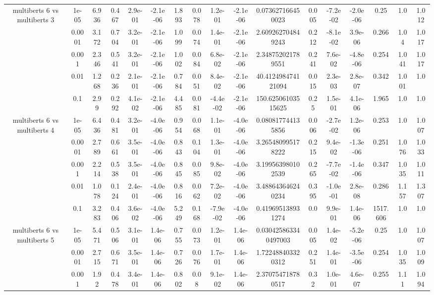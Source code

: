 \begin{tabular}{|c|c|c|c|c|c|c|c|c|c|c|c|c|c|c|c|c|}
\hline
\multirow{5}{*}{multiberts 6 vs multiberts 3} & 1e-05 & 6.936 & 0.467 & 2.9e-01 & -2.1e-06 & 1.893 & 0.078 & 1.2e-01 & -2.1e-06 & 0.073627166450023 & 0.005 & -7.2e-02 & -2.0e-06 & 0.25 & 1.0 & 1.012 \\
 & 0.0001 & 3.172 & 0.704 & 3.2e-01 & -2.1e-06 & 1.099 & 0.074 & 1.4e-01 & -2.1e-06 & 2.609262704849243 & 0.212 & -8.1e-02 & 3.9e-06 & 0.266 & 1.04 & 1.017 \\
 & 0.001 & 2.346 & 0.541 & 3.2e-01 & -2.1e-06 & 1.002 & 0.084 & 6.8e-02 & -2.1e-06 & 2.348752021789551 & 0.241 & 7.6e-02 & -4.8e-06 & 0.254 & 1.041 & 1.017 \\
 & 0.01 & 1.268 & 0.236 & 2.1e-01 & -2.1e-06 & 0.784 & 0.051 & 8.4e-02 & -2.1e-06 & 40.412498474121094 & 0.015 & 2.3e-03 & 2.8e-07 & 0.342 & 1.001 & 1.0 \\
 & 0.1 & 2.99 & 0.292 & 4.1e-02 & -2.1e-06 & 4.485 & 0.081 & -4.4e-02 & -2.1e-06 & 150.62506103515625 & 0.25 & 1.5e-01 & 4.1e-06 & 1.965 & 1.0 & 1.0 \\
\hline
\multirow{5}{*}{multiberts 6 vs multiberts 4} & 1e-05 & 6.436 & 0.481 & 3.2e-01 & -4.0e-06 & 0.954 & 0.068 & 1.1e-01 & -4.0e-06 & 0.080817744135856 & 0.006 & -2.7e-02 & 1.2e-06 & 0.253 & 1.0 & 1.007 \\
 & 0.0001 & 2.789 & 0.661 & 3.5e-01 & -4.0e-06 & 0.843 & 0.104 & 1.3e-01 & -4.0e-06 & 3.265480995178222 & 0.215 & 9.4e-02 & -1.3e-06 & 0.251 & 1.076 & 1.033 \\
 & 0.001 & 2.214 & 0.538 & 3.5e-01 & -4.0e-06 & 0.845 & 0.085 & 9.8e-02 & -4.0e-06 & 3.199563980102539 & 0.265 & -7.7e-02 & -1.4e-06 & 0.347 & 1.035 & 1.011 \\
 & 0.01 & 1.078 & 0.124 & 2.4e-01 & -4.0e-06 & 0.816 & 0.062 & 7.2e-02 & -4.0e-06 & 3.488643646240234 & 0.395 & -1.0e-01 & 2.8e-08 & 0.286 & 1.157 & 1.307 \\
 & 0.1 & 3.283 & 0.406 & 3.6e-02 & -4.0e-06 & 5.249 & 0.168 & -7.9e-02 & -4.0e-06 & 0.419695138931274 & 0.0 & 9.9e-01 & 1.4e-06 & 1517.606 & 1.0 & 1.0 \\
\hline
\multirow{5}{*}{multiberts 6 vs multiberts 5} & 1e-05 & 5.471 & 0.506 & 3.1e-01 & 1.4e-06 & 0.755 & 0.073 & 1.2e-01 & 1.4e-06 & 0.030425863340497003 & 0.005 & 1.4e-02 & -5.2e-06 & 0.25 & 1.0 & 1.007 \\
 & 0.0001 & 2.715 & 0.671 & 3.5e-01 & 1.4e-06 & 0.726 & 0.076 & 1.7e-01 & 1.4e-06 & 1.722488403320312 & 0.251 & 1.4e-01 & -3.5e-06 & 0.254 & 1.035 & 1.009 \\
 & 0.001 & 1.92 & 0.478 & 3.4e-01 & 1.4e-06 & 0.802 & 0.08 & 9.1e-02 & 1.4e-06 & 2.370754718780517 & 0.32 & 1.0e-01 & 4.6e-07 & 0.255 & 1.11 & 1.094 \\

\end{tabular}
